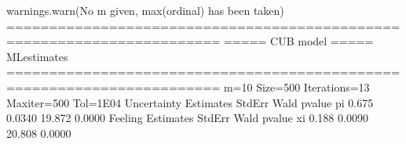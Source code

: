 \documentclass[letterpaper,10pt,english]{sphinxmanual}
\begin{document}
\begin{sphinxVerbatim}[commandchars=\\\{\}]
warnings.warn(\PYGZdq{}No m given, max(ordinal) has been taken\PYGZdq{})
=======================================================================
=====\PYGZgt{}\PYGZgt{}\PYGZgt{} CUB model \PYGZlt{}\PYGZlt{}\PYGZlt{}===== ML\PYGZhy{}estimates
=======================================================================
m=10  Size=500  Iterations=13  Maxiter=500  Tol=1E\PYGZhy{}04
\PYGZhy{}\PYGZhy{}\PYGZhy{}\PYGZhy{}\PYGZhy{}\PYGZhy{}\PYGZhy{}\PYGZhy{}\PYGZhy{}\PYGZhy{}\PYGZhy{}\PYGZhy{}\PYGZhy{}\PYGZhy{}\PYGZhy{}\PYGZhy{}\PYGZhy{}\PYGZhy{}\PYGZhy{}\PYGZhy{}\PYGZhy{}\PYGZhy{}\PYGZhy{}\PYGZhy{}\PYGZhy{}\PYGZhy{}\PYGZhy{}\PYGZhy{}\PYGZhy{}\PYGZhy{}\PYGZhy{}\PYGZhy{}\PYGZhy{}\PYGZhy{}\PYGZhy{}\PYGZhy{}\PYGZhy{}\PYGZhy{}\PYGZhy{}\PYGZhy{}\PYGZhy{}\PYGZhy{}\PYGZhy{}\PYGZhy{}\PYGZhy{}\PYGZhy{}\PYGZhy{}\PYGZhy{}\PYGZhy{}\PYGZhy{}\PYGZhy{}\PYGZhy{}\PYGZhy{}\PYGZhy{}\PYGZhy{}\PYGZhy{}\PYGZhy{}\PYGZhy{}\PYGZhy{}\PYGZhy{}\PYGZhy{}\PYGZhy{}\PYGZhy{}\PYGZhy{}\PYGZhy{}\PYGZhy{}\PYGZhy{}\PYGZhy{}\PYGZhy{}\PYGZhy{}\PYGZhy{}
Uncertainty
    Estimates  StdErr    Wald  p\PYGZhy{}value
pi      0.675  0.0340  19.872   0.0000
\PYGZhy{}\PYGZhy{}\PYGZhy{}\PYGZhy{}\PYGZhy{}\PYGZhy{}\PYGZhy{}\PYGZhy{}\PYGZhy{}\PYGZhy{}\PYGZhy{}\PYGZhy{}\PYGZhy{}\PYGZhy{}\PYGZhy{}\PYGZhy{}\PYGZhy{}\PYGZhy{}\PYGZhy{}\PYGZhy{}\PYGZhy{}\PYGZhy{}\PYGZhy{}\PYGZhy{}\PYGZhy{}\PYGZhy{}\PYGZhy{}\PYGZhy{}\PYGZhy{}\PYGZhy{}\PYGZhy{}\PYGZhy{}\PYGZhy{}\PYGZhy{}\PYGZhy{}\PYGZhy{}\PYGZhy{}\PYGZhy{}\PYGZhy{}\PYGZhy{}\PYGZhy{}\PYGZhy{}\PYGZhy{}\PYGZhy{}\PYGZhy{}\PYGZhy{}\PYGZhy{}\PYGZhy{}\PYGZhy{}\PYGZhy{}\PYGZhy{}\PYGZhy{}\PYGZhy{}\PYGZhy{}\PYGZhy{}\PYGZhy{}\PYGZhy{}\PYGZhy{}\PYGZhy{}\PYGZhy{}\PYGZhy{}\PYGZhy{}\PYGZhy{}\PYGZhy{}\PYGZhy{}\PYGZhy{}\PYGZhy{}\PYGZhy{}\PYGZhy{}\PYGZhy{}\PYGZhy{}
Feeling
    Estimates  StdErr    Wald  p\PYGZhy{}value
xi      0.188  0.0090  20.808   0.0000
\PYGZhy{}\PYGZhy{}\PYGZhy{}\PYGZhy{}\PYGZhy{}\PYGZhy{}\PYGZhy{}\PYGZhy{}\PYGZhy{}\PYGZhy{}\PYGZhy{}\PYGZhy{}\PYGZhy{}\PYGZhy{}\PYGZhy{}\PYGZhy{}\PYGZhy{}\PYGZhy{}\PYGZhy{}\PYGZhy{}\PYGZhy{}\PYGZhy{}\PYGZhy{}\PYGZhy{}\PYGZhy{}\PYGZhy{}\PYGZhy{}\PYGZhy{}\PYGZhy{}\PYGZhy{}\PYGZhy{}\PYGZhy{}\PYGZhy{}\PYGZhy{}\PYGZhy{}\PYGZhy{}\PYGZhy{}\PYGZhy{}\PYGZhy{}\PYGZhy{}\PYGZhy{}\PYGZhy{}\PYGZhy{}\PYGZhy{}\PYGZhy{}\PYGZhy{}\PYGZhy{}\PYGZhy{}\PYGZhy{}\PYGZhy{}\PYGZhy{}\PYGZhy{}\PYGZhy{}\PYGZhy{}\PYGZhy{}\PYGZhy{}\PYGZhy{}\PYGZhy{}\PYGZhy{}\PYGZhy{}\PYGZhy{}\PYGZhy{}\PYGZhy{}\PYGZhy{}\PYGZhy{}\PYGZhy{}\PYGZhy{}\PYGZhy{}\PYGZhy{}\PYGZhy{}\PYGZhy{}

\end{sphinxVerbatim}
\end{document}
